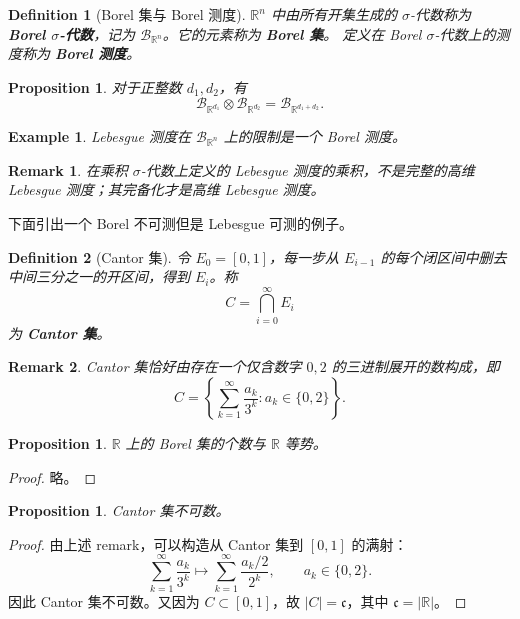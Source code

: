 \documentclass[12pt,letterpaper,twoside,openright]{ctexbook}
\theoremstyle{bluehead}
\newtheorem{proposition}[theorem]{Proposition}
\theoremstyle{olivehead}
\newtheorem{definition}{Definition}
\theoremstyle{orangehead}
\newtheorem{example}[theorem]{Example}
\theoremstyle{redremark}
\newtheorem*{remark}{Remark}
\begin{document}
\begin{definition}[Borel 集与 Borel 测度]
$\mathbb{R}^n$ 中由所有开集生成的 $\sigma$-代数称为 \textbf{Borel $\sigma$-代数}，记为 $\mathcal{B}_{\mathbb{R}^n}$。它的元素称为 \textbf{Borel 集}。
定义在 Borel $\sigma$-代数上的测度称为 \textbf{Borel 测度}。
\end{definition}
\begin{proposition}
对于正整数 $d_1,d_2$，有
\[
\mathcal{B}_{\mathbb{R}^{d_1}}\otimes\mathcal{B}_{\mathbb{R}^{d_2}}
=\mathcal{B}_{\mathbb{R}^{d_1+d_2}}.
\]
\end{proposition}
\begin{center}
\setlength{\fboxsep}{12pt}
\end{center}
\begin{example}
Lebesgue 测度在 $\mathcal{B}_{\mathbb{R}^n}$ 上的限制是一个 Borel 测度。
\end{example}
\begin{remark}
在乘积 $\sigma$-代数上定义的 Lebesgue 测度的乘积，不是完整的高维 Lebesgue 测度；其完备化才是高维 Lebesgue 测度。
\end{remark}

\noindent
下面引出一个 Borel 不可测但是 Lebesgue 可测的例子。
\begin{definition}[Cantor 集]
令 $E_0=[0,1]$，每一步从 $E_{i-1}$ 的每个闭区间中删去中间三分之一的开区间，得到 $E_i$。称
\[
C=\bigcap_{i=0}^{\infty}E_i
\]
为 \textbf{Cantor 集}。
\end{definition}

\begin{remark}
Cantor 集恰好由存在一个仅含数字 $0,2$ 的三进制展开的数构成，即
\[
C=\left\{\sum_{k=1}^{\infty}\frac{a_k}{3^k}:a_k\in\{0,2\}\right\}.
\]
\end{remark}
\begin{proposition}
$\mathbb{R}$ 上的 Borel 集的个数与 $\mathbb{R}$ 等势。
\end{proposition}
\begin{proof}
略。
\end{proof}

\begin{proposition}
Cantor 集不可数。
\end{proposition}
\begin{proof}
由上述 remark，可以构造从 Cantor 集到 $[0,1]$ 的满射：
\[
\sum_{k=1}^{\infty}\frac{a_k}{3^k}
\longmapsto
\sum_{k=1}^{\infty}\frac{a_k/2}{2^k},
\qquad a_k\in\{0,2\}.
\]
因此 Cantor 集不可数。又因为 $C\subset[0,1]$，故 $|C|=\mathfrak{c}$，其中 $\mathfrak{c}=|\mathbb{R}|$。
\end{proof}
\end{document}
